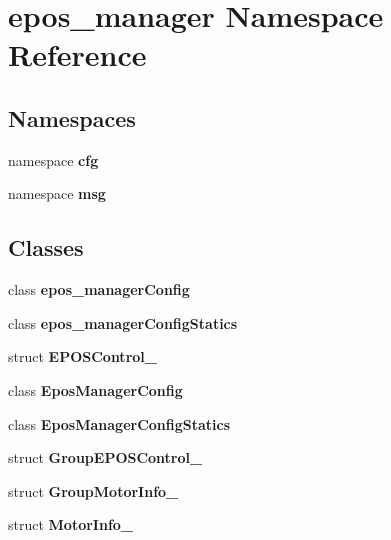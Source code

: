 \section{epos\-\_\-manager \-Namespace \-Reference}
\label{namespaceepos__manager}
\subsection*{\-Namespaces}
\begin{DoxyCompactItemize}
\item 
namespace {\bf cfg}
\item 
namespace {\bf msg}
\end{DoxyCompactItemize}
\subsection*{\-Classes}
\begin{DoxyCompactItemize}
\item 
class {\bf epos\-\_\-manager\-Config}
\item 
class {\bf epos\-\_\-manager\-Config\-Statics}
\item 
struct {\bf \-E\-P\-O\-S\-Control\-\_\-}
\item 
class {\bf \-Epos\-Manager\-Config}
\item 
class {\bf \-Epos\-Manager\-Config\-Statics}
\item 
struct {\bf \-Group\-E\-P\-O\-S\-Control\-\_\-}
\item 
struct {\bf \-Group\-Motor\-Info\-\_\-}
\item 
struct {\bf \-Motor\-Info\-\_\-}
\end{DoxyCompactItemize}
